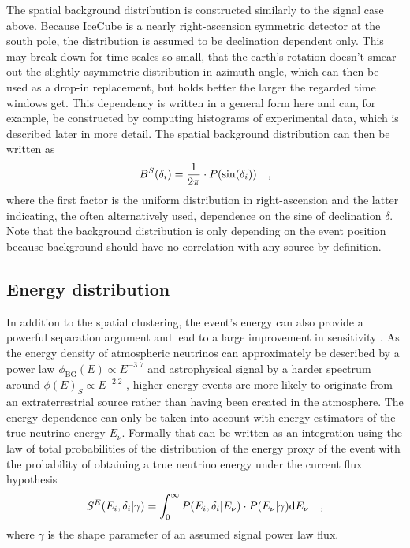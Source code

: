 The spatial background distribution is constructed similarly to the signal case above.
Because IceCube is a nearly right-ascension symmetric detector at the south pole, the distribution is assumed to be declination dependent only.
This may break down for time scales so small, that the earth's rotation doesn't smear out the slightly asymmetric distribution in azimuth angle, which can then be used as a drop-in replacement, but holds better the larger the regarded time windows get.
This dependency is written in a general form here and can, for example, be constructed by computing histograms of experimental data, which is described later in more detail.
The spatial background distribution can then be written as
\begin{equation}
  B^S(\delta_i) = \frac{1}{2\pi} \cdot P(\sin(\delta_i))
  \quad\text{,}
\end{equation}
where the first factor is the uniform distribution in right-ascension and the latter indicating, the often alternatively used, dependence on the sine of declination $\delta$.
Note that the background distribution is only depending on the event position because background should have no correlation with any source by definition.

\subsection{Energy distribution}
In addition to the spatial clustering, the event's energy can also provide a powerful separation argument and lead to a large improvement in sensitivity .
As the energy density of atmospheric neutrinos can approximately be described by a power law $\phi_\mathrm{BG}(E) \propto E^{-3.7}$ and astrophysical signal by a harder spectrum around $\phi(E)_S \propto E^{-2.2}$ , higher energy events are more likely to originate from an extraterrestrial source rather than having been created in the atmosphere.
The energy dependence can only be taken into account with energy estimators of the true neutrino energy $E_\nu$.
Formally that can be written as an integration using the law of total probabilities of the distribution of the energy proxy of the event with the probability of obtaining a true neutrino energy under the current flux hypothesis
\begin{equation}
  S^E(E_i, \delta_i|\gamma) =
    \int_0^\infty P(E_i,\delta_i|E_\nu)\cdot P(E_\nu|\gamma) \mathrm{d}E_\nu
    \quad\text{,}
\end{equation}
where $\gamma$ is the shape parameter of an assumed signal power law flux.

